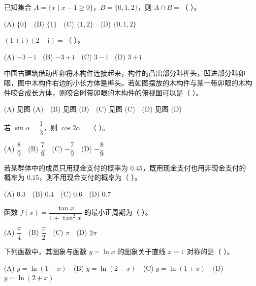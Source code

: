 \begin{question}
已知集合 $A = \{x \mid x - 1 \geqslant 0\}$，$B = \{0, 1, 2\}$，则 $A \cap B =$（ ）。

(A) $\{0\}$　(B) $\{1\}$　(C) $\{1, 2\}$　(D) $\{0, 1, 2\}$

\end{question}
\begin{question}
$(1 + \mathrm i)(2 - \mathrm i) =$（ ）。

(A) $-3 - \mathrm i$　(B) $-3 + \mathrm i$　(C) $3 - \mathrm i$　(D) $3 + \mathrm i$

\Needspace{0.4\textheight}
\end{question}
\begin{question}
中国古建筑借助榫卯将木构件连接起来，构件的凸出部分叫榫头，凹进部分叫卯眼，图中木构件右边的小长方体是榫头。若如图摆放的木构件与某一带卯眼的木构件咬合成长方体，则咬合时带卯眼的木构件的俯视图可以是（ ）。
\nopagebreak[4]
\begin{center}\end{center}
\nopagebreak[4]
(A) 见图 (A)　(B) 见图 (B)　(C) 见图 (C)　(D) 见图 (D)

\end{question}
\begin{question}
若 $\sin\alpha = \dfrac13$，则 $\cos 2\alpha =$（ ）。

(A) $\dfrac89$　(B) $\dfrac79$　(C) $-\dfrac79$　(D) $-\dfrac89$

\end{question}
\begin{question}
若某群体中的成员只用现金支付的概率为 $0.45$，既用现金支付也用非现金支付的概率为 $0.15$，则不用现金支付的概率为（ ）。

(A) $0.3$　(B) $0.4$　(C) $0.6$　(D) $0.7$

\end{question}
\begin{question}
函数 $f(x) = \dfrac{\tan x}{1 + \tan^2 x}$ 的最小正周期为（ ）。

(A) $\dfrac\pi4$　(B) $\dfrac\pi2$　(C) $\pi$　(D) $2\pi$

\end{question}
\begin{question}
下列函数中，其图象与函数 $y = \ln x$ 的图象关于直线 $x = 1$ 对称的是（ ）。

(A) $y = \ln(1 - x)$　(B) $y = \ln(2 - x)$　(C) $y = \ln(1 + x)$　(D) $y = \ln(2 + x)$

\end{question}
